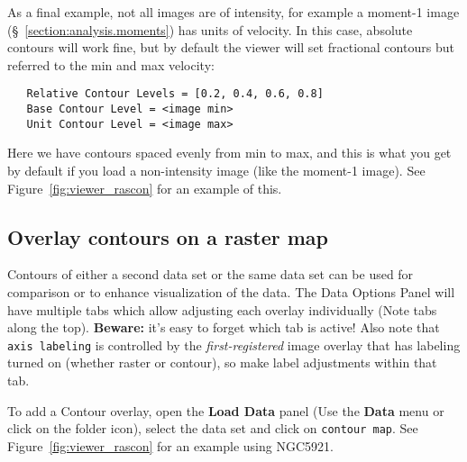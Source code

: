As a final example, not all images are of intensity, for example a
moment-1 image (\S~\ref{section:analysis.moments}) has units of
velocity.  In this case,
absolute contours will work fine, but by default the viewer will
set fractional contours but referred to the min and max velocity:
\small
\begin{verbatim}
   Relative Contour Levels = [0.2, 0.4, 0.6, 0.8]
   Base Contour Level = <image min>
   Unit Contour Level = <image max>
\end{verbatim}
\normalsize
Here we have contours spaced evenly from min to max, and this is
what you get by default if you load a non-intensity image (like
the moment-1 image).  See Figure~\ref{fig:viewer_rascon} for an
example of this.

\subsection{Overlay contours on a raster map}
\label{section:display.image.viewcontours}

Contours of either a second data set or the same data set can be used
for comparison or to enhance visualization of the data. The Data Options
Panel will have multiple tabs which allow adjusting each overlay
individually (Note tabs along the top).  {\bf Beware:} it's easy to forget
which tab is active!   Also note that {\tt axis labeling} is controlled
by the {\it first-registered} image overlay that has labeling turned on
(whether raster or contour), so make label adjustments within that tab.

To add a Contour overlay, open the {\bf Load Data} panel (Use the {\bf Data}
menu or click on the folder icon), select the data set and click on
{\tt contour map}.
See Figure~\ref{fig:viewer_rascon} for an example using NGC5921.

 

